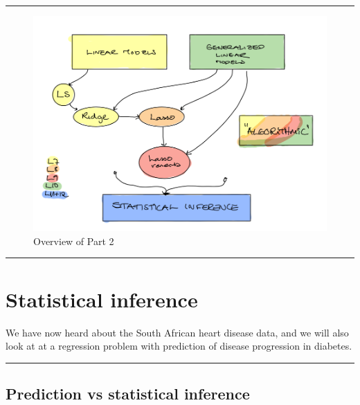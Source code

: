 \documentclass[
  letterpaper,
  DIV=11,
  numbers=noendperiod]{scrartcl}
\begin{document}
\begin{center}\rule{0.5\linewidth}{0.5pt}\end{center}

\begin{figure}

{\centering \includegraphics[width=1\textwidth,height=\textheight]{./P2overview.png}

}

\caption{Overview of Part 2}

\end{figure}

\begin{center}\rule{0.5\linewidth}{0.5pt}\end{center}

\hypertarget{statistical-inference}{%
\section{Statistical inference}\label{statistical-inference}}

We have now heard about the South African heart disease data, and we
will also look at at a regression problem with prediction of disease
progression in diabetes.

\begin{center}\rule{0.5\linewidth}{0.5pt}\end{center}

\hypertarget{prediction-vs-statistical-inference}{%
\subsection{Prediction vs statistical
inference}\label{prediction-vs-statistical-inference}}
\end{document}
